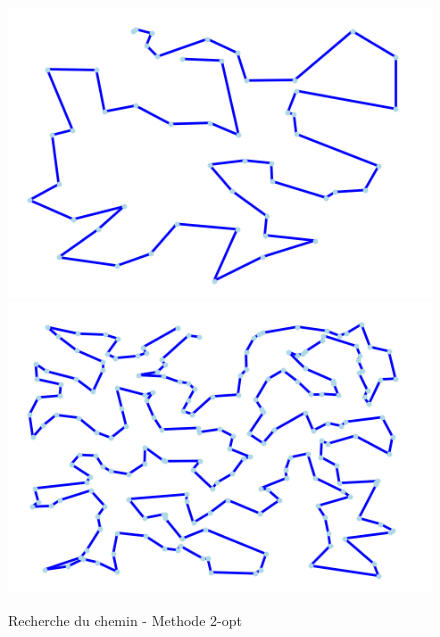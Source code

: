 \documentclass{report}
\begin{document}
\begin{figure}
  \includegraphics[scale=0.4]{image/Exmple50dechet.png}
  \includegraphics[scale=0.4]{image/Exemple200dechet.png}
  \caption{Recherche du chemin - Methode 2-opt}
  \label{2-opt_dechet}
\end{figure}
\end{document}
